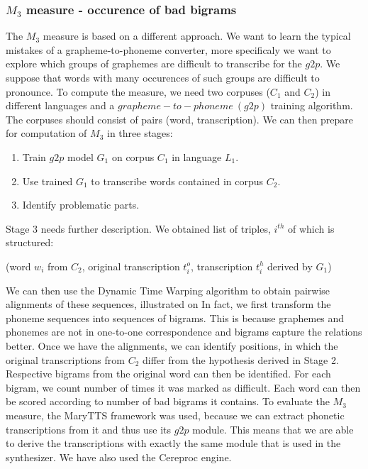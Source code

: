 \subsubsection{$M_3$ measure - occurence of bad bigrams}
The $M_3$ measure is based on a different approach.
We want to learn the typical mistakes of a grapheme-to-phoneme converter, more specificaly we want to explore which groups of graphemes are difficult to transcribe for the $g2p$.
We suppose that words with many occurences of such groups are difficult to pronounce.
To compute the measure, we need two corpuses ($C_1$ and $C_2$) in different languages and a $grapheme-to-phoneme\:(g2p)$ training algorithm.
The corpuses should consist of pairs (word, transcription).
We can then prepare for computation of $M_3$ in three stages:
\begin{enumerate}
\item Train $g2p$ model $G_1$ on corpus $C_1$ in language $L_1$.
\item Use trained $G_1$ to transcribe words contained in corpus $C_2$.
\item Identify problematic parts.
\end{enumerate}
Stage 3 needs further description.
We obtained list of triples, $i^{th}$ of which is structured:
\begin{center}
(word $w_i$ from $C_2$, original transcription $t^o_i$, transcription $t^h_i$ derived by $G_1$)
\end{center}
We can then use the Dynamic Time Warping algorithm to obtain pairwise alignments of these sequences, illustrated on 
In fact, we first transform the phoneme sequences into sequences of bigrams.
This is because graphemes and phonemes are not in one-to-one correspondence and bigrams capture the relations better.
Once we have the alignments, we can identify positions, in which the original transcriptions from $C_2$ differ from the hypothesis derived in Stage 2.
Respective bigrams from the original word can then be identified.
For each bigram, we count number of times it was marked as difficult.
Each word can then be scored according to number of bad bigrams it contains.
To evaluate the $M_3$ measure, the MaryTTS framework was used, because we can extract phonetic transcriptions from it and thus use its $g2p$ module.
This means that we are able to derive the transcriptions with exactly the same module that is used in the synthesizer.
We have also used the Cereproc engine.
